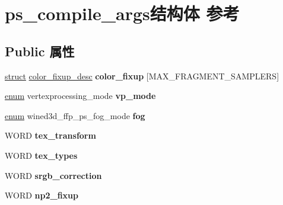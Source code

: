 \hypertarget{structps__compile__args}{}\section{ps\+\_\+compile\+\_\+args结构体 参考}
\label{structps__compile__args}
\subsection*{Public 属性}
\begin{DoxyCompactItemize}
\item 
\mbox{\label{structps__compile__args_afc89a0dda6148f646906c3e1f433012d}} 
\hyperlink{interfacestruct}{struct} \hyperlink{structcolor__fixup__desc}{color\+\_\+fixup\+\_\+desc} {\bfseries color\+\_\+fixup} \mbox{[}M\+A\+X\+\_\+\+F\+R\+A\+G\+M\+E\+N\+T\+\_\+\+S\+A\+M\+P\+L\+E\+RS\mbox{]}
\item 
\mbox{\label{structps__compile__args_a2a81a454a9cfc46baced06f6e0fcd8a0}} 
\hyperlink{interfaceenum}{enum} vertexprocessing\+\_\+mode {\bfseries vp\+\_\+mode}
\item 
\mbox{\label{structps__compile__args_a10ad185f7f689bd59b75f6c93ad8f097}} 
\hyperlink{interfaceenum}{enum} wined3d\+\_\+ffp\+\_\+ps\+\_\+fog\+\_\+mode {\bfseries fog}
\item 
\mbox{\label{structps__compile__args_a52f843bc7e077e7b9040d4172856eeb8}} 
W\+O\+RD {\bfseries tex\+\_\+transform}
\item 
\mbox{\label{structps__compile__args_a4bf22889dc3ff9da98bdfedc31afc70f}} 
W\+O\+RD {\bfseries tex\+\_\+types}
\item 
\mbox{\label{structps__compile__args_ad457ae421b2c3c50c387cd8550d73514}} 
W\+O\+RD {\bfseries srgb\+\_\+correction}
\item 
\mbox{\label{structps__compile__args_a16544638c7f58f5798d8c78dad9cd90c}} 
W\+O\+RD {\bfseries np2\+\_\+fixup}
\item 
\mbox{\label{structps__compile__args_a1eb28671eddb5d3298da1126e74862e4}} 

\end{DoxyCompactItemize}
